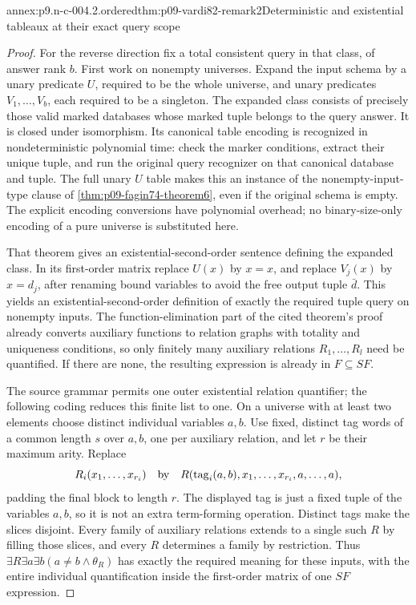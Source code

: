 \begin{annexitem}{annex:p9.n-c-004.2.ordered}{thm:p09-vardi82-remark2}{Deterministic and existential tableaux at their exact query scope}
\begin{proof}
For the reverse direction fix a total consistent query in that class,
of answer rank \(b\). First work on nonempty universes. Expand the input
schema by a unary predicate \(U\), required to be the whole universe,
and unary predicates \(V_1,\ldots,V_b\), each required to be a singleton.
The expanded class consists of precisely those valid marked databases
whose marked tuple belongs to the query answer. It is closed under
isomorphism. Its canonical table encoding is recognized in
nondeterministic polynomial time: check the marker conditions, extract
their unique tuple, and run the original query recognizer on that
canonical database and tuple. The full unary \(U\) table makes this
an instance of the nonempty-input-type clause of
\cref{thm:p09-fagin74-theorem6}, even if the original schema is empty.
The explicit encoding conversions have polynomial overhead; no
binary-size-only encoding of a pure universe is substituted here.

That theorem gives an existential-second-order sentence defining the
expanded class. In its first-order matrix replace \(U(x)\) by
\(x=x\), and replace \(V_j(x)\) by \(x=d_j\), after renaming bound
variables to avoid the free output tuple \(\bar d\). This yields an
existential-second-order definition of exactly the required tuple query
on nonempty inputs. The function-elimination part of the cited theorem's
proof already converts auxiliary functions to relation graphs with
totality and uniqueness conditions, so only finitely many auxiliary
relations \(R_1,\ldots,R_l\) need be quantified. If there are none,
the resulting expression is already in \(F\subseteq SF\).

The source grammar permits one outer existential relation quantifier;
the following coding reduces this finite list to one. On a universe with
at least two elements choose distinct individual variables \(a,b\).
Use fixed, distinct tag words of a common length \(s\) over \(a,b\),
one per auxiliary relation, and let \(r\) be their maximum arity.
Replace
\[
 R_i(x_1,\ldots,x_{r_i})
 \quad\hbox{by}\quad
 R(\operatorname{tag}_i(a,b),x_1,\ldots,x_{r_i},a,\ldots,a),
\]
padding the final block to length \(r\). The displayed tag is just a
fixed tuple of the variables \(a,b\), so it is not an extra term-forming
operation. Distinct tags make the slices disjoint. Every family of
auxiliary relations extends to a single such \(R\) by filling those
slices, and every \(R\) determines a family by restriction. Thus
\(\exists R\exists a\exists b(a\ne b\land\theta_R)\) has exactly
the required meaning for these inputs, with the entire individual
quantification inside the first-order matrix of one \(SF\) expression.


\end{proof}
\end{annexitem}
